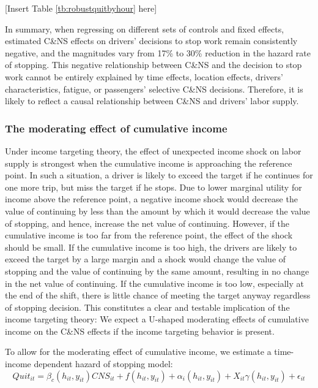 \documentclass[reviewmode,AEJ]{AEA}
\begin{document}
\begin{center}
	[Insert Table \ref{tb:robustquitbyhour} here]
\end{center}

In summary, when regressing on different sets of controls and fixed effects, estimated C\&NS effects on
drivers' decisions to stop work remain consistently negative, and the magnitudes vary
from 17\% to 30\% reduction in the hazard rate of stopping. This negative relationship between C\&NS and the decision to stop work cannot
be entirely explained by time effects, location effects, drivers' characteristics, fatigue, or passengers' 
selective C\&NS decisions. Therefore, it is likely to reflect a causal relationship between C\&NS and 
drivers' labor supply.


\subsubsection{The moderating effect of cumulative income} Under income targeting theory, the effect of unexpected income shock on labor supply is strongest when the cumulative income is approaching the reference point. In such a situation, a driver is likely to exceed the target if he continues for one more trip, but  miss the target if he stops. Due to lower marginal utility for income above the reference point, a negative income shock would decrease the value of continuing by less than the amount by which it would decrease the value of stopping, and hence, increase the net value of continuing. However, if the cumulative income is too far from the reference point, the effect of the shock should be small. If the cumulative income is too high, the drivers are likely to exceed the target by a large margin and a shock would change the value of stopping and the value of continuing by the same amount, resulting in no change in the net value of continuing. If the cumulative income is too low, especially at the end of the shift, there is little chance of meeting the target anyway regardless of stopping decision. This constitutes a clear and testable implication of the income targeting theory: We expect a U-shaped moderating effects of cumulative income on the C\&NS effects if the income targeting behavior is present.

To allow for the moderating effect of cumulative income, we estimate a time-income dependent hazard of stopping model:
\begin{equation}
    \label{eq:2dlwr}
    Quit_{it} = \beta_c(h_{it}, y_{it}) {CNS}_{it} + f(h_{it}, y_{it}) + \alpha_{i}(h_{it}, y_{it}) + X_{it}\gamma(h_{it}, y_{it}) + \epsilon_{it}
\end{equation}
\end{document}

